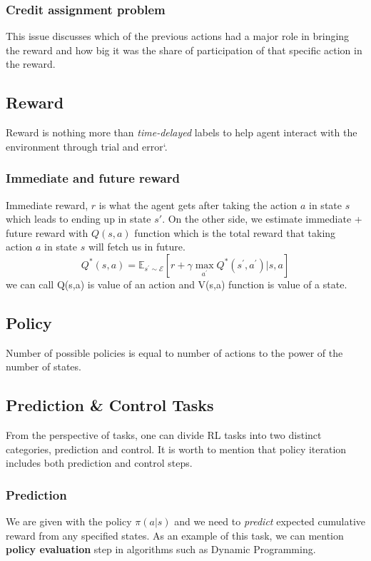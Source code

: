 \documentclass[letterpaper,12pt]{article}
\begin{document}
    \subsubsection{Credit assignment problem}
    This issue discusses which of the previous actions had a major role in bringing the reward and how big it was the share of participation of that specific action in the reward.

    \subsection{Reward}
    Reward is nothing more than \textit{time-delayed} labels to help agent interact with the environment through trial and error`.
    \subsubsection{Immediate and future reward}
    Immediate reward, $r$ is what the agent gets after taking the action $a$ in state $s$ which leads to ending up in state $s'$. On the other side, we estimate immediate + future reward with $Q(s,a)$ function which is the total reward that taking action $a$ in state $s$ will fetch us in future.
    \begin{equation}
        Q ^ { * } ( s , a ) = \mathbb { E } _ { s ^ { \prime } \sim \mathcal { E } } \left[ r + \gamma \max _ { a ^ { \prime } } Q ^ { * } \left( s ^ { \prime } , a ^ { \prime } \right) | s , a \right]
    \end{equation}
    we can call Q(s,a) is value of an action and V(s,a) function is value of a state.

    \subsection{Policy}
    Number of possible policies is equal to number of actions to the power of the number of states.

    \subsection{Prediction \& Control Tasks}
    From the perspective of tasks, one can divide RL tasks into two distinct categories, prediction and control. It is worth to mention that policy iteration includes both prediction and control steps.

    \subsubsection{Prediction}
    We are given with the policy $\pi(a|s)$ and we need to \textit{predict} expected cumulative reward from any specified states. As an example of this task, we can mention \textbf{policy evaluation} step in algorithms such as Dynamic Programming.
\end{document}
